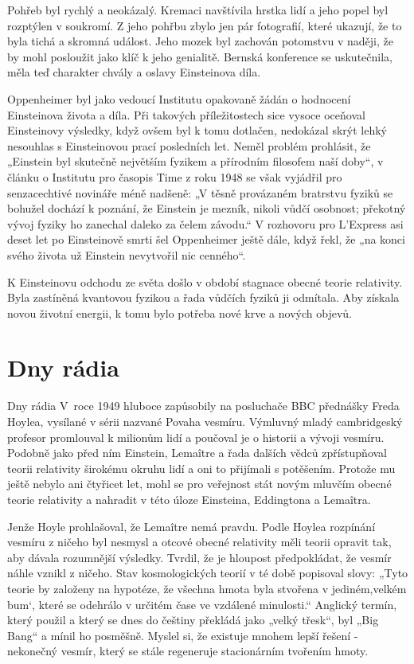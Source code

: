   Pohřeb byl rychlý a neokázalý. Kremaci navštívila hrstka lidí a jeho popel byl rozptýlen v
  soukromí. Z jeho pohřbu zbylo jen pár fotografií, které ukazují, že to byla tichá a skromná
  událost. Jeho mozek byl zachován potomstvu v naději, že by mohl posloužit jako klíč k jeho
  genialitě. Bernská konference se uskutečnila, měla teď charakter chvály a oslavy Einsteinova díla.
  
  Oppenheimer byl jako vedoucí Institutu opakovaně žádán o hodnocení Einsteinova života a díla. Při
  takových příležitostech sice vysoce oceňoval Einsteinovy výsledky, když ovšem byl k tomu dotlačen,
  nedokázal skrýt lehký nesouhlas s Einsteinovou prací posledních let. Neměl problém prohlásit, že
  „Einstein byl skutečně největším fyzikem a přírodním filosofem naší doby“, v článku o Institutu
  pro časopis Time z roku 1948 se však vyjádřil pro senzacechtivé novináře méně nadšeně: „V těsně
  provázaném bratrstvu fyziků se bohužel dochází k poznání, že Einstein je mezník, nikoli vůdčí
  osobnost; překotný vývoj fyziky ho zanechal daleko za čelem závodu.“ V rozhovoru pro L’Express asi
  deset let po Einsteinově smrti šel Oppenheimer ještě dále, když řekl, že „na konci svého života už
  Einstein nevytvořil nic cenného“. 
  
  K Einsteinovu odchodu ze světa došlo v období stagnace obecné teorie relativity. Byla zastíněná
  kvantovou fyzikou a řada vůdčích fyziků ji odmítala. Aby získala novou životní energii, k tomu
  bylo potřeba nové krve a nových objevů.

\section{Dny rádia}\label{feyIchIIIsecVII}
  Dny rádia V roce 1949 hluboce zapůsobily na posluchače BBC přednášky Freda Hoylea, vysílané v
  sérii nazvané Povaha vesmíru. Výmluvný mladý cambridgeský profesor promlouval k milionům lidí a
  poučoval je o historii a vývoji vesmíru. Podobně jako před ním Einstein, Lemaître a řada dalších
  vědců zpřístupňoval teorii relativity širokému okruhu lidí a oni to přijímali s potěšením. Protože
  mu ještě nebylo ani čtyřicet let, mohl se pro veřejnost stát novým mluvčím obecné teorie
  relativity a nahradit v této úloze Einsteina, Eddingtona a Lemaîtra. 

  Jenže Hoyle prohlašoval, že Lemaître nemá pravdu. Podle Hoylea rozpínání vesmíru z ničeho byl
  nesmysl a otcové obecné relativity měli teorii opravit tak, aby dávala rozumnější výsledky.
  Tvrdil, že je hloupost předpokládat, že vesmír náhle vznikl z ničeho. Stav kosmologických teorií v
  té době popisoval slovy: „Tyto teorie by založeny na hypotéze, že všechna hmota byla stvořena v
  jediném,velkém bum‘, které se odehrálo v určitém čase ve vzdálené minulosti.“ Anglický termín,
  který použil a který se dnes do češtiny překládá jako „velký třesk“, byl „Big Bang“ a mínil ho
  posměšně. Myslel si, že existuje mnohem lepší řešení - nekonečný vesmír, který se stále regeneruje
  stacionárním tvořením hmoty. 

